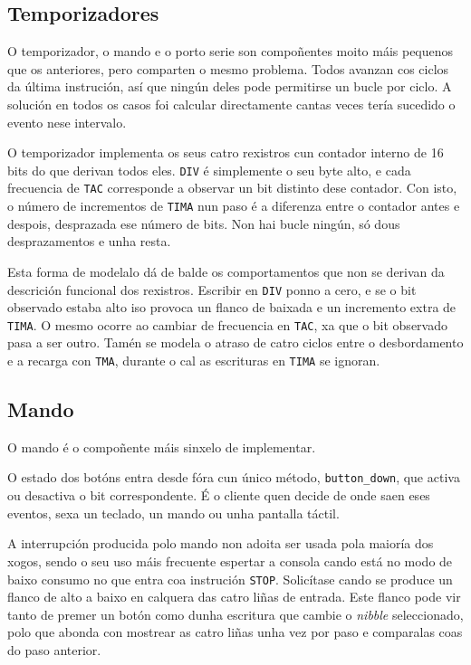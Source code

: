 \subsection{Temporizadores}

O temporizador, o mando e o porto serie son compoñentes moito máis pequenos que os anteriores, pero comparten o mesmo problema.
Todos avanzan cos ciclos da última instrución, así que ningún deles pode permitirse un bucle por ciclo.
A solución en todos os casos foi calcular directamente cantas veces tería sucedido o evento nese intervalo.

O temporizador implementa os seus catro rexistros cun contador interno de 16 bits do que derivan todos eles.
\texttt{DIV} é simplemente o seu byte alto, e cada frecuencia de \texttt{TAC} corresponde a observar un bit distinto dese contador.
Con isto, o número de incrementos de \texttt{TIMA} nun paso é a diferenza entre o contador antes e despois, desprazada ese número de bits.
Non hai bucle ningún, só dous desprazamentos e unha resta.

Esta forma de modelalo dá de balde os comportamentos que non se derivan da descrición funcional dos rexistros.
Escribir en \texttt{DIV} ponno a cero, e se o bit observado estaba alto iso provoca un flanco de baixada e un incremento extra de \texttt{TIMA}.
O mesmo ocorre ao cambiar de frecuencia en \texttt{TAC}, xa que o bit observado pasa a ser outro.
Tamén se modela o atraso de catro ciclos entre o desbordamento e a recarga con \texttt{TMA},
durante o cal as escrituras en \texttt{TIMA} se ignoran.

\subsection{Mando}
O mando é o compoñente máis sinxelo de implementar.

O estado dos botóns entra desde fóra cun único método, \texttt{button\_down}, que activa ou desactiva o bit correspondente.
É o cliente quen decide de onde saen eses eventos, sexa un teclado, un mando ou unha pantalla táctil.

A interrupción producida polo mando non adoita ser usada pola maioría dos xogos, sendo o seu uso máis frecuente
espertar a consola cando está no modo de baixo consumo no que entra coa instrución \texttt{STOP}.
Solicítase cando se produce un flanco de alto a baixo en calquera das catro liñas de entrada.
Este flanco pode vir tanto de premer un botón como dunha escritura que cambie o \textit{nibble} seleccionado,
polo que abonda con mostrear as catro liñas unha vez por paso e comparalas coas do paso anterior.


